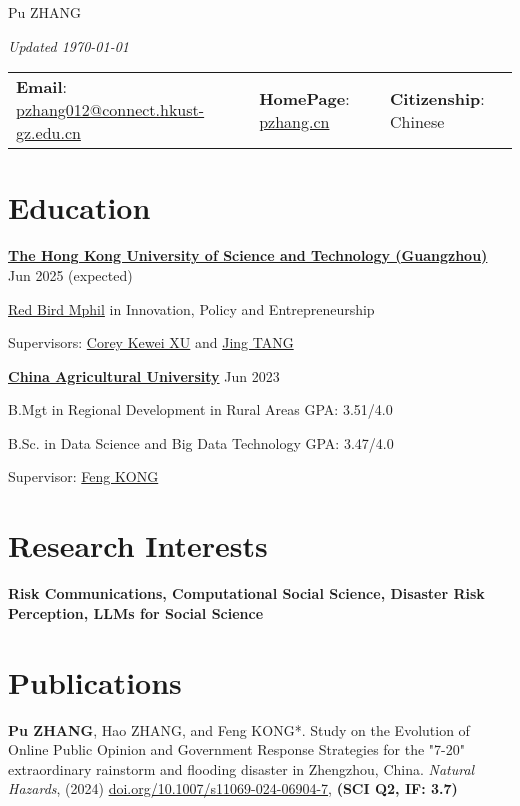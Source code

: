\documentclass[letterpaper, 11pt]{article}
\begin{document}
\setlength{\parindent}{0pt}
\begin{center}
    \Huge Pu ZHANG
\end{center}
\hfill{\it\footnotesize Updated \today}

\vspace{0cm} 
\begin{center}
\begin{tabular}{lll}
\textbf{Email}: \href{mailto:pzhang012@connect.hkust-gz.edu.cn}{pzhang012@connect.hkust-gz.edu.cn} &
\hspace{0.1in} \textbf{HomePage}: \href{https://pzhang.cn}{pzhang.cn} &
\hspace{0.1in} \textbf{Citizenship}: Chinese 
\end{tabular}
\end{center}

\section{Education}
\textbf{\href{https://www.hkust-gz.edu.cn/}{The Hong Kong University of Science and Technology (Guangzhou)}} \hfill Jun 2025 (expected)

\href{https://www.hkust-gz.edu.cn/academics/teaching-and-learning-innovation/red-bird-mphil-program/}{Red Bird Mphil} in {Innovation, Policy and Entrepreneurship}

Supervisors: \href{https://facultyprofiles.hkust-gz.edu.cn/faculty-personal-page/XU-Kewei/coreyxu}{Corey Kewei XU} and \href{https://facultyprofiles.hkust-gz.edu.cn/faculty-personal-page/TANG-Jing/jingtang}{Jing TANG} 

\vspace{0.5em}
\textbf{\href{http://en.cau.edu.cn/}{China Agricultural University}} \hfill Jun 2023

B.Mgt in Regional Development in Rural Areas \hfill{ GPA: 3.51/4.0}

B.Sc. in Data Science and Big Data Technology \hfill{ GPA: 3.47/4.0}

Supervisor: \href{https://cohd.cau.edu.cn/art/2020/11/27/art_48059_998984.html}{Feng KONG} 

\section{Research Interests}
\textbf{Risk Communications, Computational Social Science, Disaster Risk Perception, LLMs for Social Science}

\section{Publications}
\textbf{Pu ZHANG}, Hao ZHANG, and Feng KONG*. Study on the Evolution of Online Public Opinion and Government Response Strategies for the "7-20" extraordinary rainstorm and flooding disaster in Zhengzhou, China. \textit{Natural Hazards}, (2024) \href{https://doi.org/10.1007/s11069-024-06904-7}{doi.org/10.1007/s11069-024-06904-7}, \textbf{(SCI Q2, IF: 3.7)}
\end{document}
